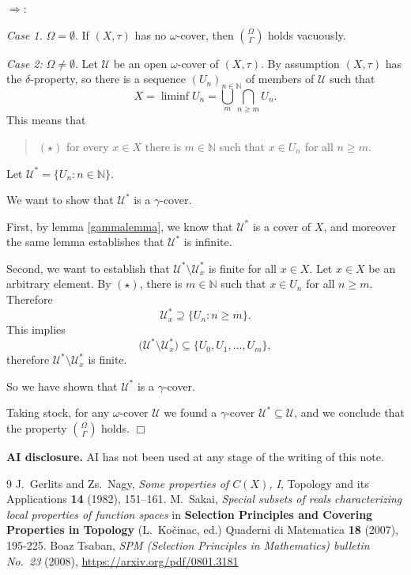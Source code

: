\documentclass[12pt]{amsart}
\gdef\cal{\mathcal}
\begin{document}
$\Rightarrow:$ 

{\sl Case 1.} $\Omega = \emptyset$. If $(X,\tau)$ has no $\omega$-cover,
then ${\Omega\choose\Gamma}$ holds vacuously.

{\sl Case 2:} $\Omega\neq\emptyset$. 
Let ${\cal U}$ be an open $\omega$-cover of $(X,\tau)$.
By assumption $(X,\tau)$ has the $\delta$-property, so 
there is a sequence $(U_n)_{n\in\mathbb{N}}$ of members of ${\cal U}$
such that $$X = \liminf U_n=\bigcup_m\bigcap_{n\geq m}U_n.$$ 
This means that
\begin{quote}
$(\star)$ for every $x\in X$ there is $m\in \mathbb{N}$ such that
$x\in U_n$ for all $n\geq m$.
\end{quote}
Let ${\cal U}^* = \{U_n: n\in\mathbb{N}\}$. 

We want to show that ${\cal U}^*$ is a $\gamma$-cover.

First, by lemma \ref{gammalemma}, we know that ${\cal U}^*$ 
is a cover of $X$, and moreover the same lemma establishes
that ${\cal U}^*$ is infinite.

Second, we want to establish that ${\cal U}^*\setminus {\cal U}^*_x$
is finite for all $x\in X$.  Let $x\in X$ be an arbitrary
element. By $(\star)$, there is $m\in \mathbb{N}$
such that $x\in U_n$ for all $n\geq m$. Therefore $${\cal U}^*_x \supseteq
\{U_n: n\geq m\}.$$ This implies
$$\big({\cal U}^*\setminus {\cal U}^*_x\big) \subseteq \big\{U_0, U_1,\ldots, 
U_{m}\big\},$$ therefore ${\cal U}^*\setminus {\cal U}^*_x$ is finite.

So we have shown that ${\cal U}^*$ is a $\gamma$-cover.

Taking stock, for any $\omega$-cover ${\cal U}$ we found a $\gamma$-cover
${\cal U}^*\subseteq {\cal U}$, and we conclude that the property 
${\Omega\choose\Gamma}$ holds.
\hfill{$\Box$}

{\bf AI disclosure.} AI has not been used at any stage of the writing
of this note.

\begin{thebibliography}{9}
   J.~Gerlits and Zs.~Nagy, {\it Some properties of
    $C(X)$, I}, Topology and its Applications {\bf 14} (1982), 151–161.
   M.~Sakai, {\it Special subsets of reals characterizing
	  local properties of function spaces} in {\bf Selection Principles
		and Covering Properties in Topology} (L.~Ko\v{c}inac, ed.)
		Quaderni di Matematica {\bf 18} (2007), 195-225.
   Boaz Tsaban, {\it SPM (Selection Principles in Mathematics)
	  bulletin No.~23} (2008), \url{https://arxiv.org/pdf/0801.3181}
\end{thebibliography}
\end{document}

